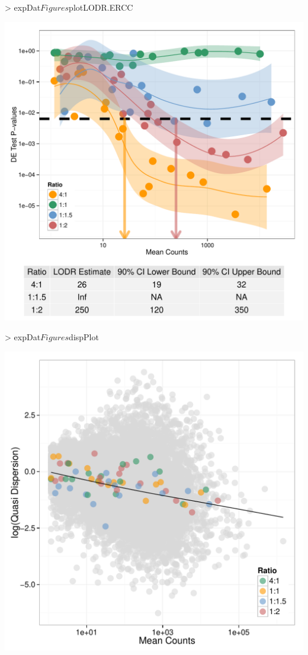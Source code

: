 \documentclass{article}
\begin{document}
\begin{center}
\begin{Schunk}
\begin{Sinput}
> expDat$Figures$plotLODR.ERCC
\end{Sinput}
\end{Schunk}
\includegraphics{erccdashboardVignette-printPanelB}
\end{center}
\clearpage
\begin{center}
\begin{Schunk}
\begin{Sinput}
> expDat$Figures$dispPlot
\end{Sinput}
\end{Schunk}
\includegraphics{erccdashboardVignette-printPanelC}
\end{center}
\end{document}
